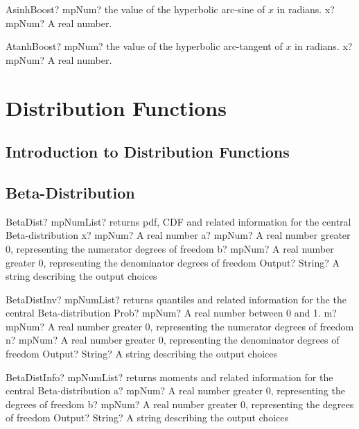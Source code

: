 \documentclass[12pt,a4paper,openany]{book}
\begin{document}
\begin{mpFunctionsExtract}
\mpFunctionOne
{AsinhBoost? mpNum? the value of the hyperbolic arc-sine  of $x$ in radians.}
{x? mpNum? A real number.}
\end{mpFunctionsExtract}

\begin{mpFunctionsExtract}
\mpFunctionOne
{AtanhBoost? mpNum? the value of the hyperbolic arc-tangent  of $x$ in radians.}
{x? mpNum? A real number.}
\end{mpFunctionsExtract}

\chapter{Distribution Functions}

\section{Introduction to Distribution Functions}

\section{Beta-Distribution}

\begin{mpFunctionsExtract}
\mpFunctionFour
{BetaDist? mpNumList? returns pdf, CDF and related information for the central Beta-distribution}
{x? mpNum? A real number}
{a? mpNum? A real number greater 0, representing the numerator  degrees of freedom}
{b? mpNum? A real number greater 0, representing the denominator degrees of freedom}
{Output? String? A string describing the output choices}
\end{mpFunctionsExtract}

\begin{mpFunctionsExtract}
\mpFunctionFour
{BetaDistInv? mpNumList? returns quantiles and related information for the the central Beta-distribution}
{Prob? mpNum? A real number between 0 and 1.}
{m? mpNum? A real number greater 0, representing the numerator  degrees of freedom}
{n? mpNum? A real number greater 0, representing the denominator degrees of freedom}
{Output? String? A string describing the output choices}
\end{mpFunctionsExtract}

\begin{mpFunctionsExtract}
\mpFunctionThree
{BetaDistInfo? mpNumList? returns moments and related information for the central Beta-distribution}
{a? mpNum? A real number greater 0, representing the degrees of freedom}
{b? mpNum? A real number greater 0, representing the degrees of freedom}
{Output? String? A string describing the output choices}
\end{mpFunctionsExtract}
\end{document}

